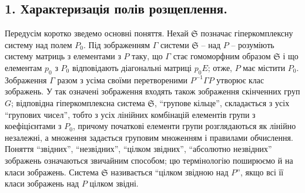 \documentclass[11pt]{article}
\newcommand{\mS}{\mathfrak{S}}
\begin{document}
\subsection*{1. Характеризація полів розщеплення.}

\noindent Передусім коротко зведемо основні поняття. Нехай $\mS$ позначає гіперкомплексну систему над полем $P_0$. Під зображенням $\Gamma$ системи $\mS$ -- над $P$ -- розуміють систему матриць з елементами з $P$ таку, що $\Gamma$ стає гомоморфним образом $\mS$ і що елементам $p_0$ з $P_0$ відповідають діагональні матриці $p_0E$; отже, $P$ має містити $P_0$. Зображення $\Gamma$ разом з усіма своїми перетвореними $P^{-1}\Gamma P$ утворює клас зображень. У так означені зображення входять також зображення скінченних груп $G$; відповідна гіперкомплексна система $\mS$, “групове кільце”, складається з усіх “групових чисел”, тобто з усіх лінійних комбінацій елементів групи з коефіцієнтами з $P_0$, причому початкові елементи групи розглядаються як лінійно незалежні, а множення задається груповим множенням і правилами обчислення. Поняття “звідних”, “незвідних”, “цілком звідних”, “абсолютно незвідних” зображень означаються звичайним способом; цю термінологію поширюємо й на класи зображень. Система $\mS$ називається “цілком звідною над $P$”, якщо всі її класи зображень над $P$ цілком звідні.
\end{document}
